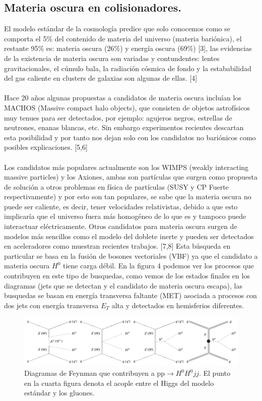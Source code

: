 \subsection{Materia oscura en colisionadores.}

El modelo estándar de la cosmología predice que solo conocemos como se comporta el 5\% del contenido de materia del universo (materia bariónica), el restante 95\% es: materia oscura (26\%) y energía oscura (69\%) [3], las evidencias de la existencia de materia oscura son variadas y contundentes: lentes gravitacionales, el cúmulo bala, la radiación cósmica de fondo y la estababilidad del gas caliente en clusters de galaxias son algunas de ellas. [4] 
\\
\\
Hace 20 años algunas propuestas a candidatos de materia oscura incluían los MACHOS (Massive compact halo objects), que consisten de objetos astrofísicos muy tenues para ser detectados, por ejemplo: agujeros negros, estrellas de neutrones, enanas blancas, etc. Sin embargo experimentos recientes descartan esta posibilidad y por tanto nos dejan solo con los candidatos no bariónicos como posibles explicaciones. [5,6]
\\
\\
Los candidatos más populares actualmente son los WIMPS (weakly interacting massive particles) y los Axiones, ambas son partículas que surgen como propuesta de solución a otros problemas en física de partículas (SUSY y CP Fuerte respectivamente) y por esto son tan populares, se sabe que la materia oscura no puede ser caliente, es decir, tener velocidades relativistas, debido a que esto implicaría que el universo fuera más homogéneo de lo que es y tampoco puede interactuar eléctricamente. Otros candidatos para materia oscura surgen de modelos más sencillos como el modelo del doblete inerte y pueden ser detectados en aceleradores como muestran recientes trabajos. [7,8] Esta búsqueda en particular se basa en la fusión de bosones vectoriales (VBF) ya que el candidato a materia oscura $H^0$ tiene carga débil. En la figura 4 podemos ver los procesos que contribuyen en este tipo de busquedas, como vemos de los estados finales en los diagramas (jets que se detectan y el candidato de materia oscura escapa), las busquedas se basan en energía transversa faltante (MET) asociada a procesos con dos jets con energía transversa $E_T$ alta y detectados en hemisferios diferentes.
\begin{figure}
	\centering
	\includegraphics[width=15cm]{F4.png}
	\caption{\label{fig:frog} Diagramas de Feynman que contribuyen a pp$\rightarrow H^0H^0 jj$. El punto en la cuarta figura denota el acople entre el Higgs del modelo estándar y los gluones.}
\end{figure}
